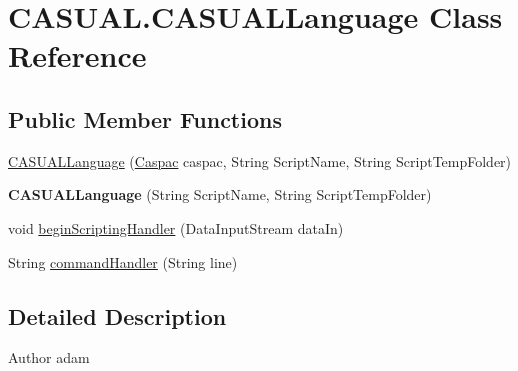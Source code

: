 \hypertarget{classCASUAL_1_1CASUALLanguage}{\section{C\-A\-S\-U\-A\-L.\-C\-A\-S\-U\-A\-L\-Language Class Reference}
\label{classCASUAL_1_1CASUALLanguage}
}
\subsection*{Public Member Functions}
\begin{DoxyCompactItemize}
\item 
\hyperlink{classCASUAL_1_1CASUALLanguage_a14a0e6124a7fae9887ea66c5ac2a05f5}{C\-A\-S\-U\-A\-L\-Language} (\hyperlink{classCASUAL_1_1caspac_1_1Caspac}{Caspac} caspac, String Script\-Name, String Script\-Temp\-Folder)
\item 
\hypertarget{classCASUAL_1_1CASUALLanguage_a3810cecfa7d1fefb40a5726dcc31e549}{{\bfseries C\-A\-S\-U\-A\-L\-Language} (String Script\-Name, String Script\-Temp\-Folder)}\label{classCASUAL_1_1CASUALLanguage_a3810cecfa7d1fefb40a5726dcc31e549}

\item 
void \hyperlink{classCASUAL_1_1CASUALLanguage_a90fef30865a00b2787dfaba5d0a7ff91}{begin\-Scripting\-Handler} (Data\-Input\-Stream data\-In)
\item 
String \hyperlink{classCASUAL_1_1CASUALLanguage_a62fd547394ee54e631d711809c11f677}{command\-Handler} (String line)
\end{DoxyCompactItemize}


\subsection{Detailed Description}
\begin{DoxyAuthor}{Author}
adam 
\end{DoxyAuthor}


